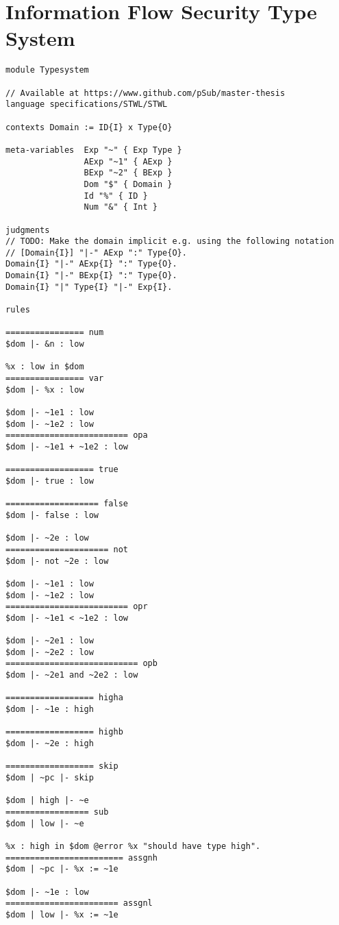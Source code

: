 \section{Information Flow Security Type System}
\label{sec:inform-flow-secur}

\begin{lstlisting}[language=sltc]
module Typesystem

// Available at https://www.github.com/pSub/master-thesis
language specifications/STWL/STWL

contexts Domain := ID{I} x Type{O}

meta-variables  Exp "~" { Exp Type }
                AExp "~1" { AExp }
                BExp "~2" { BExp }              
                Dom "$" { Domain }
                Id "%" { ID }
                Num "&" { Int }

judgments
// TODO: Make the domain implicit e.g. using the following notation
// [Domain{I}] "|-" AExp ":" Type{O}.
Domain{I} "|-" AExp{I} ":" Type{O}.
Domain{I} "|-" BExp{I} ":" Type{O}.
Domain{I} "|" Type{I} "|-" Exp{I}.

rules

================ num
$dom |- &n : low

%x : low in $dom
================ var
$dom |- %x : low

$dom |- ~1e1 : low
$dom |- ~1e2 : low
========================= opa
$dom |- ~1e1 + ~1e2 : low

================== true
$dom |- true : low

=================== false
$dom |- false : low

$dom |- ~2e : low
===================== not
$dom |- not ~2e : low

$dom |- ~1e1 : low
$dom |- ~1e2 : low
========================= opr
$dom |- ~1e1 < ~1e2 : low

$dom |- ~2e1 : low
$dom |- ~2e2 : low
=========================== opb
$dom |- ~2e1 and ~2e2 : low

================== higha
$dom |- ~1e : high

================== highb
$dom |- ~2e : high

================== skip
$dom | ~pc |- skip

$dom | high |- ~e
================= sub
$dom | low |- ~e

%x : high in $dom @error %x "should have type high".
======================== assgnh
$dom | ~pc |- %x := ~1e

$dom |- ~1e : low
======================= assgnl
$dom | low |- %x := ~1e


\end{lstlisting}
